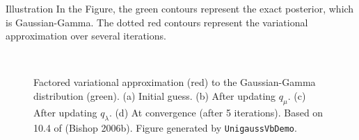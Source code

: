 \documentclass[10pt,mathserif]{beamer}
\begin{document}
\begin{frame}{Illustration}
In the Figure, the green contours represent the exact posterior, which is Gaussian-Gamma. The dotted red contours represent the variational approximation over several iterations.

\begin{figure}[h]
\centering
{}
\\
\caption{Factored variational approximation (red) to the Gaussian-Gamma distribution (green). (a) Initial guess. (b) After updating $q_\mu$. (c) After updating $q_\lambda$. (d) At convergence (after 5 iterations). Based on 10.4 of (Bishop 2006b). Figure generated by \texttt{UnigaussVbDemo}.}
\end{figure}
\end{frame}        
        
\end{document}

